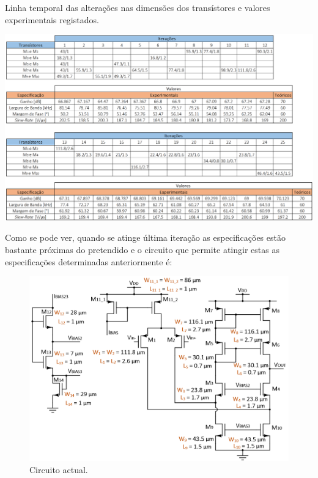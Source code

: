 \documentclass[11pt]{article}
\numberwithin{equation}{section}
\begin{document}
\begin{table}[H]
	\centering
	\caption{Linha temporal das alterações nas dimensões dos transístores e valores experimentais registados.}
	\vspace{-1.5mm}
	\includegraphics[keepaspectratio=true, scale=0.40]{teoricas/tabelaF1}
\end{table}

Como se pode ver, quando se atinge última iteração as especificações estão bastante próximas do pretendido e o circuito que permite atingir estas as especificações determinadas anteriormente é:

\begin{figure}[H]
	\centering
	\includegraphics[keepaspectratio=true, scale=0.70]{teoricas/ajustesF1}
	\vspace{-0.5em}
	\caption{Circuito actual.}
	\vspace{-0.8em}
\end{figure}
\end{document}
